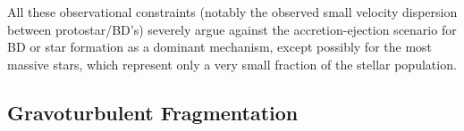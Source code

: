 
All these observational constraints (notably the observed small velocity dispersion between protostar/BD’s) severely
argue against the accretion-ejection scenario for BD or star formation as a dominant mechanism, except possibly for
the most massive stars, which represent only a very small fraction of the stellar population.


\subsection{Gravoturbulent Fragmentation}
\label{sec:gravo}

